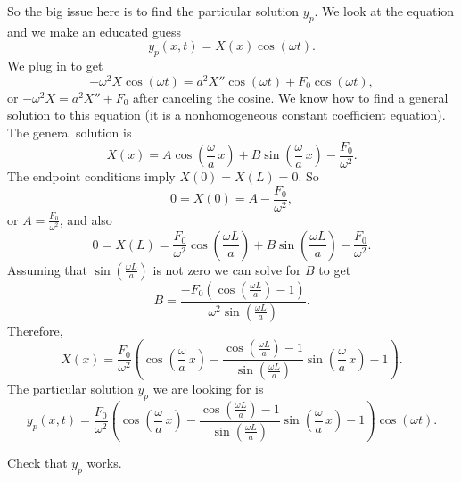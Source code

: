 \documentclass[12pt]{book}
\begin{document}
So the big issue here is to find the particular solution $y_p$.
We look at the equation and we make an educated guess
\begin{equation*}
y_p(x,t) = X(x) \cos (\omega t) .
\end{equation*}
We plug in to get
\begin{equation*}
-\omega^2 X \cos ( \omega t) = a^2 X'' \cos ( \omega t) +
F_0 \cos ( \omega t ) ,
\end{equation*}
or
$-\omega^2 X = a^2 X'' + F_0$ after canceling the cosine.
We know how to find a general solution to this equation (it is a
nonhomogeneous constant coefficient equation).
The general solution is
\begin{equation*}
X(x) = A \cos \left( \frac{\omega}{a} \, x \right)
+ B \sin \left( \frac{\omega}{a} \, x \right) -
\frac{F_0}{\omega^2} .
\end{equation*}
The endpoint conditions imply $X(0) = X(L) = 0$.  So
\begin{equation*}
0 = X(0) = A - \frac{F_0}{\omega^2} ,
\end{equation*}
or $A = \frac{F_0}{\omega^2}$, and also
\begin{equation*}
0 = X(L)
= \frac{F_0}{\omega^2} \cos \left( \frac{\omega L}{a} \right)
+ B \sin \left( \frac{\omega L}{a} \right) -
\frac{F_0}{\omega^2} .
\end{equation*}
Assuming that $\sin ( \frac{\omega L}{a} )$ is not zero we can solve for $B$ to
get
\begin{equation} \label{natfreq:Beq}
B = 
\frac{-F_0 \left( \cos \left( \frac{\omega L}{a} \right) - 1 \right)}%
{\omega^2 \sin \left( \frac{\omega L}{a} \right)}.
\end{equation}
Therefore,
\begin{equation*}
X(x) =
\frac{F_0}{\omega^2} \left(
\cos \left(  \frac{\omega}{a} \, x \right) -
\frac{\cos \left( \frac{\omega L}{a} \right) - 1}%
{\sin \left( \frac{\omega L}{a} \right)}
\sin \left( \frac{\omega}{a} \, x \right)
- 1
\right) .
\end{equation*}
The particular solution $y_p$ we are looking for is
\begin{equation*}
\boxed{~~
y_p(x,t) =
\frac{F_0}{\omega^2} \left(
\cos \left( \frac{\omega}{a} \, x \right) -
\frac{\cos \left( \frac{\omega L}{a} \right) - 1}%
{\sin \left( \frac{\omega L}{a}\right)}
\sin \left( \frac{\omega}{a} \, x \right)
-1
\right)
\cos ( \omega t) .
~~}
\end{equation*}

\begin{exercise}
Check that $y_p$ works.
\end{exercise}
\end{document}
